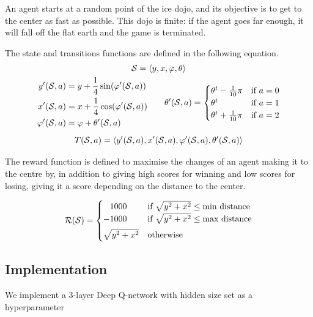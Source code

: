 An agent starts at a random point of the ice dojo, and its objective is to get to the center as fast as possible.
This dojo is finite: if the agent goes far enough, it will fall off the flat earth and the game is terminated.

The state and transitions functions are defined in the following equation.
\newcommand{\statet}{\left< y, x, \varphi, \theta \right>}
\begin{gather*}
	\state = \statet \\
	\begin{aligned}
		y'(\state, a) &= y + \frac{1}{4} \sin(\varphi'(\state, a)) \\
		x'(\state, a) &= x + \frac{1}{4} \cos(\varphi'(\state, a)) \\
		\varphi'(\state, a) &= \varphi + \theta'(\state, a)
	\end{aligned}
	\qquad
	\theta'(\state, a)= \begin{cases}
		\theta^t - \frac{1}{10} \pi & \text{if } a = 0 \\
		\theta^t & \text{if } a = 1 \\
		\theta^t + \frac{1}{10} \pi & \text{if } a = 2
	\end{cases} \\[1ex]
	T(\state, a) = \left< y'(\state, a), x'(\state, a), \varphi'(\state, a), \theta'(\state, a) \right>
\end{gather*}

The reward function is defined to maximise the changes of an agent making it to the centre by, in addition to giving high scores for winning and low scores for losing, giving it a score depending on the distance to the center.

\begin{equation*}
	\mathcal{R}(\mathcal{S}) = \begin{cases}
		\phantom{+}1000 & \text{if } \sqrt{y^2 + x^2} \leq \text{min distance} \\
		-1000 & \text{if } \sqrt{y^2 + x^2} \leq \text{max distance} \\[1ex]
		\sqrt{y^2 + x^2} & \text{otherwise}
	\end{cases}
\end{equation*}

\subsection{Implementation}
We implement a 3-layer Deep Q-network with hidden size set as a hyperparameter

